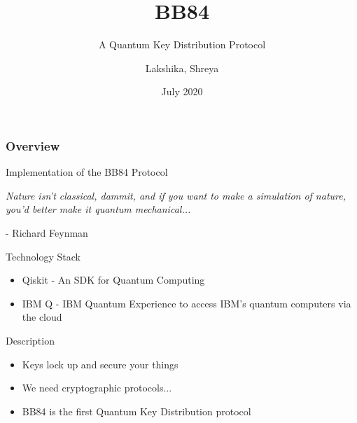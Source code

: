 \documentclass{beamer}
\title[BB84]{BB84}
\subtitle{A Quantum Key Distribution Protocol}
\author[Team 37]{Lakshika, Shreya}
\date{July 2020}
\begin{document}
\begin{frame}
	\titlepage
\end{frame}

\begin{frame}
	\frametitle{Overview}
	 Implementation of the BB84 Protocol
\end{frame}


\begin{frame}[standout]
    \begin{center}
        \emph{Nature isn’t classical, dammit, and if you want to make a simulation of nature, you’d better make it quantum mechanical...}
    \end{center}
    \begin{flushright}
        - Richard Feynman
    \end{flushright}
\end{frame}


\begin{frame}{Technology Stack}
	\begin{itemize}
		\item Qiskit - An SDK for Quantum Computing
		\item IBM Q - IBM Quantum Experience to access IBM's quantum computers via the cloud
	\end{itemize}
\end{frame}

\begin{frame}{Description}
    \begin{itemize}[<+->] 
        \item Keys lock up and secure your things
        \item We need cryptographic protocols...
        \item BB84 is the first Quantum Key Distribution protocol
    \end{itemize}
\end{frame}
\end{document}
